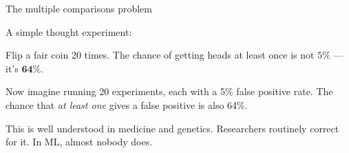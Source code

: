 \documentclass[aspectratio=169,11pt]{beamer}
\begin{document}
\begin{frame}[label=multicomp]{The multiple comparisons problem}

A simple thought experiment:

\vspace{0.3em}

{\small Flip a fair coin 20 times. The chance of getting heads at least once is not $5\%$ --- it's $\mathbf{64\%}$.}

\vspace{0.3em}

{\small Now imagine running 20 experiments, each with a 5\% false positive rate. The chance that \emph{at least one} gives a false positive is also 64\%.}

\vspace{0.3em}

\begin{center}
\end{center}

\vspace{0.2em}

{\small This is well understood in medicine and genetics. Researchers routinely correct for it. In ML, almost nobody does.}
\end{frame}
\end{document}

